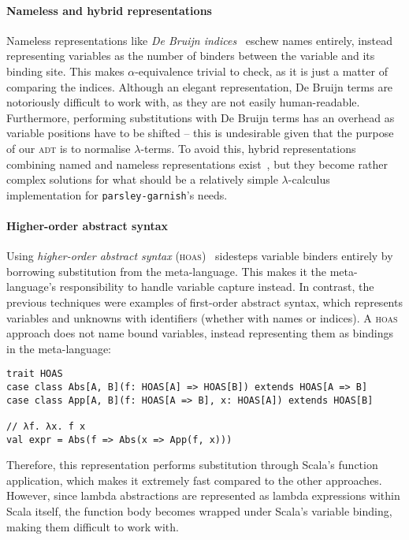 \documentclass[../../../main.tex]{subfiles}
\begin{document}
\paragraph{Nameless and hybrid representations}
Nameless representations like \emph{De Bruijn indices}~\cite{debruijn_lambda_1972} eschew names entirely, instead representing variables as the number of binders between the variable and its binding site.
This makes $\alpha$-equivalence trivial to check, as it is just a matter of comparing the indices.
Although an elegant representation, De Bruijn terms are notoriously difficult to work with, as they are not easily human-readable.
Furthermore, performing substitutions with De Bruijn terms has an overhead as variable positions have to be shifted -- this is undesirable given that the purpose of our \textsc{adt} is to normalise $\lambda$-terms.
To avoid this, hybrid representations combining named and nameless representations exist~\cite{mcbride_imnotanumber_2004,chargueraud_locally_2012}, but they become rather complex solutions for what should be a relatively simple $\lambda$-calculus implementation for \texttt{parsley-garnish}'s needs.

\paragraph{Higher-order abstract syntax}
Using \emph{higher-order abstract syntax} (\textsc{hoas})~\cite{pfenning_hoas_1988} sidesteps variable binders entirely by borrowing substitution from the meta-language.
This makes it the meta-language's responsibility to handle variable capture instead.
In contrast, the previous techniques were examples of first-order abstract syntax, which represents variables and unknowns with identifiers (whether with names or indices).
A \textsc{hoas} approach does not name bound variables, instead representing them as bindings in the meta-language:

\begin{verbatim}
trait HOAS
case class Abs[A, B](f: HOAS[A] => HOAS[B]) extends HOAS[A => B]
case class App[A, B](f: HOAS[A => B], x: HOAS[A]) extends HOAS[B]

// λf. λx. f x
val expr = Abs(f => Abs(x => App(f, x)))
\end{verbatim}
%
Therefore, this representation performs substitution through Scala's function application, which makes it extremely fast compared to the other approaches.
However, since lambda abstractions are represented as lambda expressions within Scala itself, the function body becomes wrapped under Scala's variable binding, making them difficult to work with.
\end{document}
